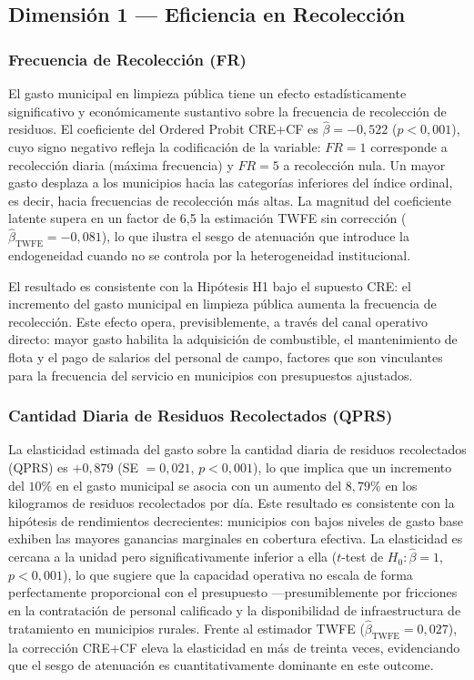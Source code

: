 \subsection{Dimensión 1 --- Eficiencia en Recolección}
\label{sec:d1}

\subsubsection*{Frecuencia de Recolección (FR)}

El gasto municipal en limpieza pública tiene un efecto estadísticamente significativo y económicamente sustantivo sobre la frecuencia de recolección de residuos. El coeficiente del Ordered Probit CRE+CF es $\hat{\beta} = -0{,}522$ ($p < 0{,}001$), cuyo signo negativo refleja la codificación de la variable: $FR = 1$ corresponde a recolección diaria (máxima frecuencia) y $FR = 5$ a recolección nula. Un mayor gasto desplaza a los municipios hacia las categorías inferiores del índice ordinal, es decir, hacia frecuencias de recolección más altas. La magnitud del coeficiente latente supera en un factor de 6{,}5 la estimación TWFE sin corrección ($\hat{\beta}_{\text{TWFE}} = -0{,}081$), lo que ilustra el sesgo de atenuación que introduce la endogeneidad cuando no se controla por la heterogeneidad institucional.

El resultado es consistente con la Hipótesis H1 bajo el supuesto CRE: el incremento del gasto municipal en limpieza pública aumenta la frecuencia de recolección. Este efecto opera, previsiblemente, a través del canal operativo directo: mayor gasto habilita la adquisición de combustible, el mantenimiento de flota y el pago de salarios del personal de campo, factores que son vinculantes para la frecuencia del servicio en municipios con presupuestos ajustados.

\subsubsection*{Cantidad Diaria de Residuos Recolectados (QPRS)}

La elasticidad estimada del gasto sobre la cantidad diaria de residuos recolectados (QPRS) es $+0{,}879$ (SE $= 0{,}021$, $p < 0{,}001$), lo que implica que un incremento del $10\%$ en el gasto municipal se asocia con un aumento del $8{,}79\%$ en los kilogramos de residuos recolectados por día. Este resultado es consistente con la hipótesis de rendimientos decrecientes: municipios con bajos niveles de gasto base exhiben las mayores ganancias marginales en cobertura efectiva. La elasticidad es cercana a la unidad pero significativamente inferior a ella ($t$-test de $H_0: \hat{\beta} = 1$, $p < 0{,}001$), lo que sugiere que la capacidad operativa no escala de forma perfectamente proporcional con el presupuesto ---presumiblemente por fricciones en la contratación de personal calificado y la disponibilidad de infraestructura de tratamiento en municipios rurales. Frente al estimador TWFE ($\hat{\beta}_{\text{TWFE}} = 0{,}027$), la corrección CRE+CF eleva la elasticidad en más de treinta veces, evidenciando que el sesgo de atenuación es cuantitativamente dominante en este outcome.

